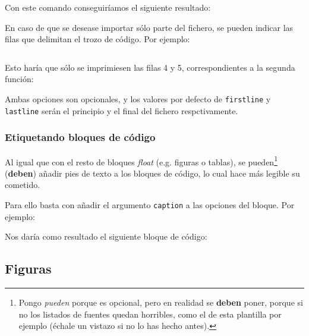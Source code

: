 \documentclass[%
    school=etsisi,%
    type=pfg,%
    degree=61CD,%
]{upm-report}
\begin{document}
Con este comando conseguiríamos el siguiente resultado:



En caso de que se desease importar sólo parte del fichero, se pueden indicar las filas que delimitan el trozo de código. Por ejemplo:

\begin{lstlisting}[language=TeX]

\end{lstlisting}

Esto haría que sólo se imprimiesen las filas 4 y 5, correspondientes a la segunda función:



Ambas opciones son opcionales, y los valores por defecto de \texttt{firstline} y \texttt{lastline} serán el principio y el final del fichero respctivamente.

\subsubsection{Etiquetando bloques de código}

Al igual que con el resto de bloques \textit{float} (e.g. figuras o tablas), se pueden\footnote{Pongo \textit{pueden} porque es opcional, pero en realidad se \textbf{deben} poner, porque si no los listados de fuentes quedan horribles, como el de esta plantilla por ejemplo (échale un vistazo si no lo has hecho antes).} (\textbf{deben}) añadir pies de texto a los bloques de código, lo cual hace más legible su cometido.

Para ello basta con añadir el argumento \texttt{caption} a las opciones del bloque. Por ejemplo:



Nos daría como resultado el siguiente bloque de código:
 


\subsection{Figuras}
\label{ch:figuras}
\end{document}
